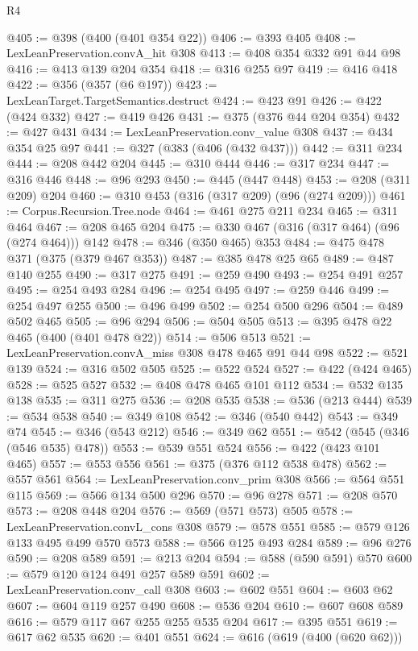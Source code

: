 \begin{lexlean}{R4}
\begin{coremodule}
{{{{{{{{{{{{{@405 := @398 (@400 (@401 @354 @22))
@406 := @393 @405
@408 := LexLeanPreservation.convA_hit @308
@413 := @408 @354 @332 @91 @44 @98
@416 := @413 @139 @204 @354
@418 := @316 @255 @97
@419 := @416 @418
@422 := @356 (@357 (@6 @197))
@423 := LexLeanTarget.TargetSemantics.destruct
@424 := @423 @91
@426 := @422 (@424 @332)
@427 := @419 @426
@431 := @375 (@376 @44 @204 @354)
@432 := @427 @431
@434 := LexLeanPreservation.conv_value @308
@437 := @434 @354 @25 @97
@441 := @327 (@383 (@406 (@432 @437)))
@442 := @311 @234
@444 := @208 @442 @204
@445 := @310 @444
@446 := @317 @234
@447 := @316 @446
@448 := @96 @293
@450 := @445 (@447 @448)
@453 := @208 (@311 @209) @204
@460 := @310 @453 (@316 (@317 @209) (@96 (@274 @209)))
@461 := Corpus.Recursion.Tree.node
@464 := @461 @275 @211 @234
@465 := @311 @464
@467 := @208 @465 @204
@475 := @330 @467 (@316 (@317 @464) (@96 (@274 @464))) @142
@478 := @346 (@350 @465) @353
@484 := @475 @478 @371 (@375 (@379 @467 @353))
@487 := @385 @478 @25 @65
@489 := @487 @140 @255
@490 := @317 @275
@491 := @259 @490
@493 := @254 @491 @257
@495 := @254 @493 @284
@496 := @254 @495
@497 := @259 @446
@499 := @254 @497 @255
@500 := @496 @499
@502 := @254 @500 @296
@504 := @489 @502 @465
@505 := @96 @294
@506 := @504 @505
@513 := @395 @478 @22 @465 (@400 (@401 @478 @22))
@514 := @506 @513
@521 := LexLeanPreservation.convA_miss @308 @478 @465 @91 @44 @98
@522 := @521 @139
@524 := @316 @502 @505
@525 := @522 @524
@527 := @422 (@424 @465)
@528 := @525 @527
@532 := @408 @478 @465 @101 @112
@534 := @532 @135 @138
@535 := @311 @275
@536 := @208 @535
@538 := @536 (@213 @444)
@539 := @534 @538
@540 := @349 @108
@542 := @346 (@540 @442)
@543 := @349 @74
@545 := @346 (@543 @212)
@546 := @349 @62
@551 := @542 (@545 (@346 (@546 @535) @478))
@553 := @539 @551 @524
@556 := @422 (@423 @101 @465)
@557 := @553 @556
@561 := @375 (@376 @112 @538 @478)
@562 := @557 @561
@564 := LexLeanPreservation.conv_prim @308
@566 := @564 @551 @115
@569 := @566 @134 @500 @296
@570 := @96 @278
@571 := @208 @570
@573 := @208 @448 @204
@576 := @569 (@571 @573) @505
@578 := LexLeanPreservation.convL_cons @308
@579 := @578 @551
@585 := @579 @126 @133 @495 @499 @570 @573
@588 := @566 @125 @493 @284
@589 := @96 @276
@590 := @208 @589
@591 := @213 @204
@594 := @588 (@590 @591) @570
@600 := @579 @120 @124 @491 @257 @589 @591
@602 := LexLeanPreservation.conv_call @308
@603 := @602 @551
@604 := @603 @62
@607 := @604 @119 @257 @490
@608 := @536 @204
@610 := @607 @608 @589
@616 := @579 @117 @67 @255 @255 @535 @204
@617 := @395 @551
@619 := @617 @62 @535
@620 := @401 @551
@624 := @616 (@619 (@400 (@620 @62)))
}}}}}}}}}}}}}
\end{coremodule}
\end{lexlean}
